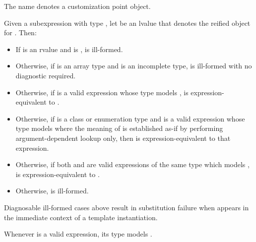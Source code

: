\pnum
The name  denotes a customization point
object.

\pnum
Given a subexpression  with type ,
let  be an lvalue that denotes the reified object for .
Then:

\begin{itemize}
\item
  If  is an rvalue and
   is ,
   is ill-formed.

\item
  Otherwise, if  is an array type and
   is an incomplete type,
   is ill-formed with no diagnostic required.

\item
  Otherwise, if 
  is a valid expression whose type models
  ,
   is expression-equivalent to
  .

\item
  Otherwise, if  is a class or enumeration type and
  is a valid expression whose type models
  where the meaning of  is established as-if by performing
  argument-dependent lookup only,
  then  is expression-equivalent to
  that expression.

\item
  Otherwise, if both  and 
  are valid expressions of the same type which models
  ,
   is expression-equivalent to
  .

\item
  Otherwise,  is ill-formed.
\end{itemize}

\pnum
\begin{note}
Diagnosable ill-formed cases above result in substitution failure
when 
appears in the immediate context of a template instantiation.
\end{note}

\pnum
\begin{note}
Whenever  is a valid expression, its type models
.
\end{note}

